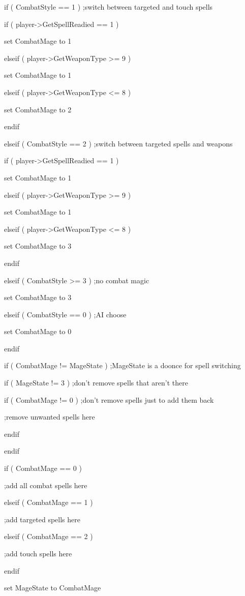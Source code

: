 \documentclass[
]{article}
\begin{document}
if ( CombatStyle == 1 ) ;switch between targeted and touch spells

if ( player-\textgreater GetSpellReadied == 1 )

set CombatMage to 1

elseif ( player-\textgreater GetWeaponType \textgreater= 9 )

set CombatMage to 1

elseif ( player-\textgreater GetWeaponType \textless= 8 )

set CombatMage to 2

endif

elseif ( CombatStyle == 2 ) ;switch between targeted spells and weapons

if ( player-\textgreater GetSpellReadied == 1 )

set CombatMage to 1

elseif ( player-\textgreater GetWeaponType \textgreater= 9 )

set CombatMage to 1

elseif ( player-\textgreater GetWeaponType \textless= 8 )

set CombatMage to 3

endif

elseif ( CombatStyle \textgreater= 3 ) ;no combat magic

set CombatMage to 3

elseif ( CombatStyle == 0 ) ;AI choose

set CombatMage to 0

endif

if ( CombatMage != MageState ) ;MageState is a doonce for spell
switching

if ( MageState != 3 ) ;don't remove spells that aren't there

if ( CombatMage != 0 ) ;don't remove spells just to add them back

;remove unwanted spells here

endif

endif

if ( CombatMage == 0 )

;add all combat spells here

elseif ( CombatMage == 1 )

;add targeted spells here

elseif ( CombatMage == 2 )

;add touch spells here

endif

set MageState to CombatMage
\end{document}
